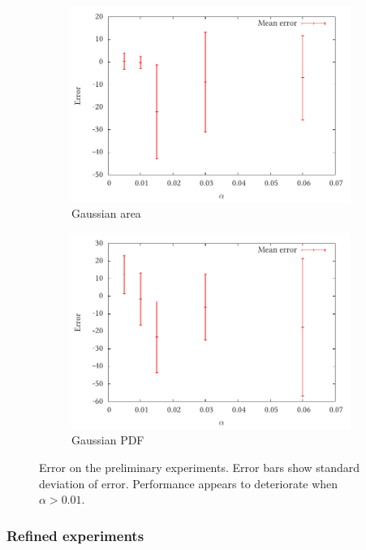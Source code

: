 \documentclass[a4paper,11pt]{article}
\begin{document}
\begin{center}
\begin{figure}
\begin{subfigure}{0.5\textwidth}
\includegraphics[width=\textwidth]{gauss_area_prelim}
\caption{Gaussian area}
\label{fig:}
\end{subfigure}
\begin{subfigure}{0.5\textwidth}
\includegraphics[width=\textwidth]{gauss_pmf_prelim}
\caption{Gaussian PDF}
\label{fig:}
\end{subfigure}
\caption{Error on the preliminary experiments. Error bars show standard
deviation of error. Performance appears to deteriorate when $\alpha>0.01$.}
\end{figure}
\end{center}
\subsubsection{Refined experiments}
\label{sec-7-1-2}
\end{document}
